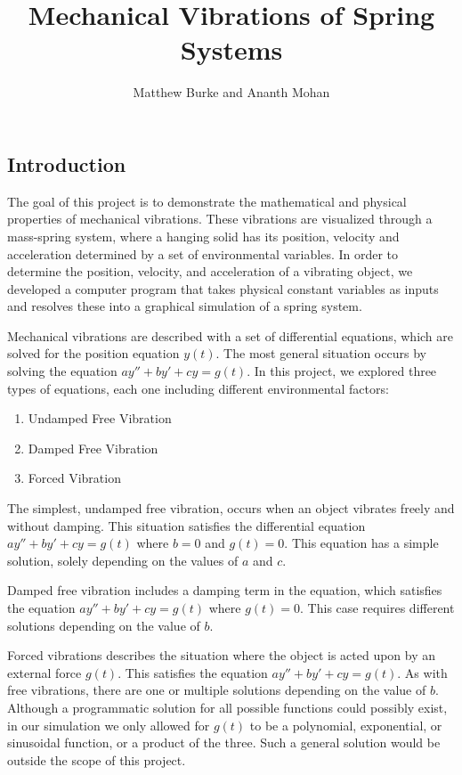 \documentclass[11pt]{article} %
\title{Mechanical Vibrations of Spring Systems}
\author{Matthew Burke and Ananth Mohan}
\begin{document}
\maketitle

\begin{multicols}{2}

\section{Introduction}

The goal of this project is to demonstrate the mathematical and physical properties of mechanical vibrations. These vibrations are visualized through a mass-spring system, where a hanging solid has its position, velocity and acceleration determined by a set of environmental variables. In order to determine the position, velocity, and acceleration of a vibrating object, we developed a computer program that takes physical constant variables as inputs and resolves these into a graphical simulation of a spring system.

Mechanical vibrations are described with a set of differential equations, which are solved for the position equation $y(t)$. The most general situation occurs by solving the equation $ay'' + by' + cy = g(t)$. In this project, we explored three types of equations, each one including different environmental factors:

\begin{enumerate}
	\item Undamped Free Vibration

	\item Damped Free Vibration

	\item Forced Vibration

\end{enumerate} 

The simplest, undamped free vibration, occurs when an object vibrates freely and without damping. This situation satisfies the differential equation $ay'' + by' + cy = g(t)$ where $b = 0$ and $g(t) = 0$. This equation has a simple solution, solely depending on the values of $a$ and $c$.

Damped free vibration includes a damping term in the equation, which satisfies the equation $ay'' + by' + cy = g(t)$ where $g(t) = 0$. This case requires different solutions depending on the value of $b$.

Forced vibrations describes the situation where the object is acted upon by an external force $g(t)$. This satisfies the equation $ay'' + by' + cy = g(t)$. As with free vibrations, there are one or multiple solutions depending on the value of $b$. Although a programmatic solution for all possible functions could possibly exist, in our simulation we only allowed for $g(t)$ to be a polynomial, exponential, or sinusoidal function, or a product of the three. Such a general solution would be outside the scope of this project.


\end{multicols}
\end{document}
